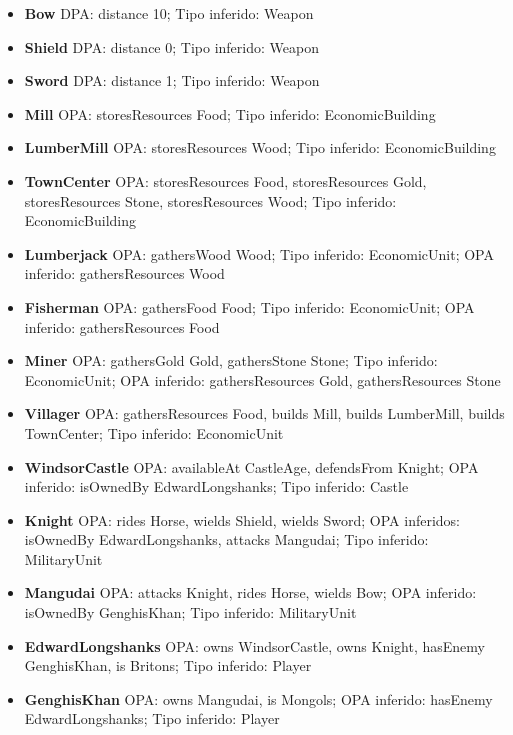 \documentclass[10pt,a4paper]{article}
\begin{document}
\begin{itemize}
    \item \textbf{Bow} DPA: distance 10; Tipo inferido: Weapon
    \item \textbf{Shield} DPA: distance 0; Tipo inferido: Weapon
    \item \textbf{Sword} DPA: distance 1; Tipo inferido: Weapon
    \item \textbf{Mill} OPA: storesResources Food; Tipo inferido: EconomicBuilding
    \item \textbf{LumberMill} OPA: storesResources Wood; Tipo inferido: EconomicBuilding
    \item \textbf{TownCenter} OPA: storesResources Food, storesResources Gold, storesResources Stone, storesResources Wood; Tipo inferido: EconomicBuilding
    \item \textbf{Lumberjack} OPA: gathersWood Wood; Tipo inferido: EconomicUnit; OPA inferido: gathersResources Wood
    \item \textbf{Fisherman} OPA: gathersFood Food; Tipo inferido: EconomicUnit; OPA inferido: gathersResources Food
    \item \textbf{Miner} OPA: gathersGold Gold, gathersStone Stone; Tipo inferido: EconomicUnit; OPA inferido: gathersResources Gold, gathersResources Stone
    \item \textbf{Villager} OPA: gathersResources Food, builds Mill, builds LumberMill, builds TownCenter; Tipo inferido: EconomicUnit
    \item \textbf{WindsorCastle} OPA: availableAt CastleAge, defendsFrom Knight; OPA inferido: isOwnedBy EdwardLongshanks; Tipo inferido: Castle
    \item \textbf{Knight} OPA: rides Horse, wields Shield, wields Sword; OPA inferidos: isOwnedBy EdwardLongshanks, attacks Mangudai; Tipo inferido: MilitaryUnit
    \item \textbf{Mangudai} OPA: attacks Knight, rides Horse, wields Bow; OPA inferido: isOwnedBy GenghisKhan; Tipo inferido: MilitaryUnit
    \item \textbf{EdwardLongshanks} OPA: owns WindsorCastle, owns Knight, hasEnemy GenghisKhan, is Britons; Tipo inferido: Player
    \item \textbf{GenghisKhan} OPA: owns Mangudai, is Mongols; OPA inferido: hasEnemy EdwardLongshanks; Tipo inferido: Player
\end{itemize}
\end{document}
